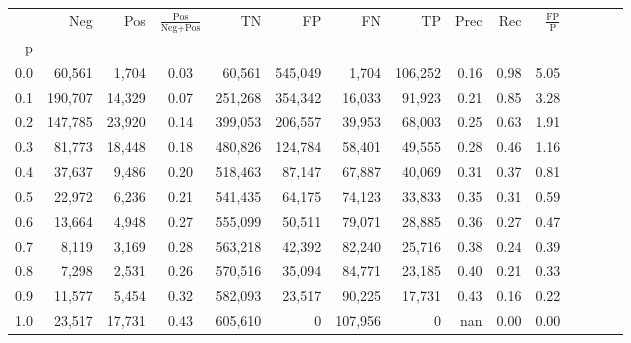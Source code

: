 \begin{tabular}{rrrcrrrrrrrrrrr}
\toprule
{} &      Neg &     Pos & $\frac{\text{Pos}}{\text{Neg}+\text{Pos}}$ &       TN &       FP &       FN &       TP &  Prec &   Rec & $\frac{\text{FP}}{\text{P}}$ \\
p   &          &         &                                            &          &          &          &          &       &       &                              \\
\midrule
0.0 &   60,561 &   1,704 &                                       0.03 &   60,561 &  545,049 &    1,704 &  106,252 &  0.16 &  0.98 &                         5.05 \\
0.1 &  190,707 &  14,329 &                                       0.07 &  251,268 &  354,342 &   16,033 &   91,923 &  0.21 &  0.85 &                         3.28 \\
0.2 &  147,785 &  23,920 &                                       0.14 &  399,053 &  206,557 &   39,953 &   68,003 &  0.25 &  0.63 &                         1.91 \\
0.3 &   81,773 &  18,448 &                                       0.18 &  480,826 &  124,784 &   58,401 &   49,555 &  0.28 &  0.46 &                         1.16 \\
0.4 &   37,637 &   9,486 &                                       0.20 &  518,463 &   87,147 &   67,887 &   40,069 &  0.31 &  0.37 &                         0.81 \\
0.5 &   22,972 &   6,236 &                                       0.21 &  541,435 &   64,175 &   74,123 &   33,833 &  0.35 &  0.31 &                         0.59 \\
0.6 &   13,664 &   4,948 &                                       0.27 &  555,099 &   50,511 &   79,071 &   28,885 &  0.36 &  0.27 &                         0.47 \\
0.7 &    8,119 &   3,169 &                                       0.28 &  563,218 &   42,392 &   82,240 &   25,716 &  0.38 &  0.24 &                         0.39 \\
0.8 &    7,298 &   2,531 &                                       0.26 &  570,516 &   35,094 &   84,771 &   23,185 &  0.40 &  0.21 &                         0.33 \\
0.9 &   11,577 &   5,454 &                                       0.32 &  582,093 &   23,517 &   90,225 &   17,731 &  0.43 &  0.16 &                         0.22 \\
1.0 &   23,517 &  17,731 &                                       0.43 &  605,610 &        0 &  107,956 &        0 &   nan &  0.00 &                         0.00 \\
\bottomrule
\end{tabular}
